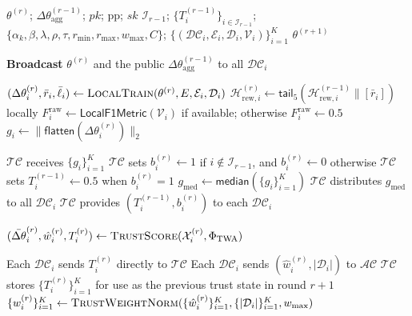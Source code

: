 \documentclass{article}
\begin{document}
\setcounter{algorithm}{0}
\renewcommand{\thealgorithm}{S\arabic{algorithm}}

\begin{algorithm}[H]
  \caption{\textsc{TWA-PPA Workflow} --- $ep_{\mathrm{twa\text{-}ppa}}$ main path}
  \label{alg:frl}
    \begin{algorithmic}[1]
    \REQUIRE $\theta^{(r)}$; $\Delta\theta_{\mathrm{agg}}^{(r-1)}$;
    $pk$; $\mathrm{pp}$; $sk$
    \REQUIRE $\mathcal I_{r-1}$;
    $\{T_i^{(r-1)}\}_{i\in\mathcal I_{r-1}}$;
    $\{\alpha_k,\beta,\lambda,\rho,\tau,r_{\min},r_{\max},w_{\max},C\}$;
    \REQUIRE
    $\{(\mathcal{DC}_i,\mathcal{E}_i,\mathcal{D}_i,\mathcal{V}_i)\}_{i=1}^{K}$
    \ENSURE $\theta^{(r+1)}$

    \STATE \textbf{Broadcast} $\theta^{(r)}$ and the public
    $\Delta\theta_{\mathrm{agg}}^{(r-1)}$ to all $\mathcal{DC}_i$

      \STATE $(\Delta\theta_i^{(r)},\bar{r}_i,\bar{\ell}_i)
      \leftarrow \textsc{LocalTrain}(\theta^{(r)},E,\mathcal{E}_i,\mathcal{D}_i)$
      \STATE $\mathcal H_{\mathrm{rew},i}^{(r)}\leftarrow
      \mathsf{tail}_5(\mathcal H_{\mathrm{rew},i}^{(r-1)}
      \mathbin{\|}[\bar r_i])$ locally
      \STATE $F_i^{\mathrm{raw}}\leftarrow\mathsf{LocalF1Metric}(\mathcal{V}_i)$ if available; otherwise $F_i^{\mathrm{raw}}\leftarrow0.5$
      \STATE $g_i\leftarrow\|\mathsf{flatten}(\Delta\theta_i^{(r)})\|_2$
    \ENDFOR

    \STATE $\mathcal{TC}$ receives $\{g_i\}_{i=1}^{K}$
    \STATE $\mathcal{TC}$ sets $b_i^{(r)}\leftarrow1$ if
    $i\notin\mathcal I_{r-1}$, and $b_i^{(r)}\leftarrow0$ otherwise
    \STATE $\mathcal{TC}$ sets $T_i^{(r-1)}\leftarrow0.5$ when $b_i^{(r)}=1$
    \STATE $g_{\mathrm{med}}\leftarrow\mathsf{median}(\{g_i\}_{i=1}^{K})$
    \STATE $\mathcal{TC}$ distributes $g_{\mathrm{med}}$ to all $\mathcal{DC}_i$
    \STATE $\mathcal{TC}$ provides $(T_i^{(r-1)},b_i^{(r)})$ to each
    $\mathcal{DC}_i$

      \STATE $(\bar{\Delta\theta}_i^{(r)},\hat{w}_i^{(r)},T_i^{(r)})
      \leftarrow\textsc{TrustScore}
      (\mathcal X_i^{(r)},\Phi_{\mathrm{TWA}})$
    \ENDFOR

    \STATE Each $\mathcal{DC}_i$ sends
    $T_i^{(r)}$ directly to $\mathcal{TC}$
    \STATE Each $\mathcal{DC}_i$ sends
    $(\hat{w}_i^{(r)},|\mathcal{D}_i|)$ to $\mathcal{AC}$
    \STATE $\mathcal{TC}$ stores
    $\{T_i^{(r)}\}_{i=1}^{K}$ for use as the previous trust state in round $r+1$
    \STATE $\{w_i^{(r)}\}_{i=1}^{K}
    \leftarrow \textsc{TrustWeightNorm}
    (\{\hat{w}_i^{(r)}\}_{i=1}^{K},
    \{|\mathcal{D}_i|\}_{i=1}^{K},w_{\max})$


\end{algorithmic}
\end{algorithm}
\end{document}
